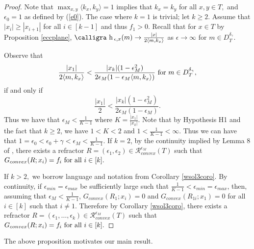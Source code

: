 \documentclass[review]{elsarticle}
\newcommand{\h}{\text{\calligra h}\,}
\begin{document}
\begin{proof}

 Note that $\max_{x,y}\langle k_x,k_y\rangle=1$ implies that $k_x=k_y$ for all $x,y\in T,$ and $\epsilon_0=1$ as defined by (\ref{e0}). The case where $k=1$ is trivial; let $k\ge 2$. Assume that $|x_i|\ge|x_{i+1}|$ for all $i\in[k-1]$ and thus $f_1>0.$ Recall that for $x\in T$ by Proposition \ref{eccplane}, $\h_{\epsilon,x}(m)\to \frac{|x|}{2\langle m,k_x\rangle}$ as $\epsilon\to \infty$ for $m\in D_T^{\delta_\gamma}$.

Observe that
\begin{equation}
    \frac{|x_1|}{2\langle m,k_x\rangle}<\frac{|x_k|(1-\epsilon_M^2)}{2\epsilon_M(1-\epsilon_M\langle m , k_{x}\rangle)}\textnormal{ for }m\in  D_T^{\delta_\gamma},
\end{equation}
if and only if
\begin{equation}
    \frac{|x_1|}{2}<\frac{|x_k|(1-\epsilon_M^2)}{2\epsilon_M(1-\epsilon_M)}.
\end{equation}
Thus we have that $\epsilon_M<\frac1{K-1}$ where $K=\frac{|x_1|}{|x_k|}$. Note that by Hypothesis H1 and the fact that $k\ge2$, we have $1<K<2$ and $1<\frac1{K-1}<\infty$. Thus we can have that $1=\epsilon_0<\epsilon_0+\gamma<\epsilon_M<\frac1{K-1}.$ If $k=2$, by the continuity implied by Lemma 8 of \cite{KOT}, there exists a refractor $R = (\epsilon_1,\epsilon_2) \in \mathcal{R}_{convex}^{\epsilon_M} (T)$ such
that $G_{convex}(R; x_i) = f_i \textnormal{ for all } i \in[k].$

If $k>2,$ we borrow language and notation from Corollary \ref{wsol3coro}. By continuity, if $\epsilon_{min}=\epsilon_{max}$ be sufficiently large such that $\frac1{K-1}<\epsilon_{min}=\epsilon_{max}$, then, assuming that $\epsilon_M<\frac1{K-1}$, $G_{convex}(R_1;x_i)=0$ and $G_{convex}(R_{1i};x_1)=0$ for all $i\in[k]$ such that $i\neq 1$. Therefore by Corollary \ref{wsol3coro}, there exists a refractor $R = (\epsilon_1,\dots,\epsilon_k) \in \mathcal{R}_{convex}^{\epsilon_M} (T)$ such
that $G_{convex}(R; x_i) = f_i \textnormal{ for all } i \in[k].$

\end{proof}

The above proposition motivates our main result.
\end{document}
